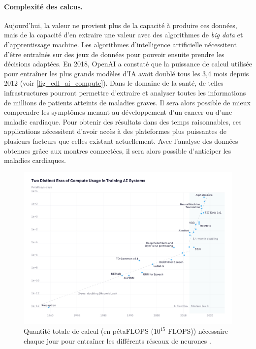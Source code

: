         

            
        \paragraph{Complexité des calcus.} 
             Aujourd'hui, la valeur ne provient plus de la capacité à produire ces données, mais de la capacité d'en extraire une valeur avec des algorithmes de \textit{big data} et d'apprentissage machine. Les algorithmes d'intelligence artificielle nécessitent d'être entraînés sur des jeux de données pour pouvoir ensuite prendre les décisions adaptées. En 2018, OpenAI a constaté que la puissance de calcul utilisée pour entraîner les plus grands modèles d'IA avait doublé tous les 3,4 mois depuis 2012 (voir \autoref{fig_edl_ai_compute}). Dans le domaine de la santé, de telles infrastructures pourront permettre d'extraire et analyser toutes les informations de millions de patients atteints de maladies graves.  Il sera alors possible de mieux comprendre les symptômes menant au développement d'un cancer ou d'une maladie cardiaque. 
             Pour obtenir des résultats dans des temps raisonnables, ces applications nécessitent d'avoir accès à des plateformes plus puissantes de plusieurs facteurs que celles existant actuellement. Avec l'analyse des données obtenues grâce aux montres connectées, il sera alors possible d'anticiper les maladies cardiaques.
             
            \begin{figure}
            \center
            \includegraphics[width=14cm]{images/edl_ai_compute.png}
            \caption{\label{fig_edl_ai_compute} Quantité totale de calcul (en pétaFLOPS ($10^{15}$ \gls{FLOPS})) nécessaire chaque jour pour entraîner les différents réseaux de neurones \cite{amodei2ai}.}
            \end{figure}

